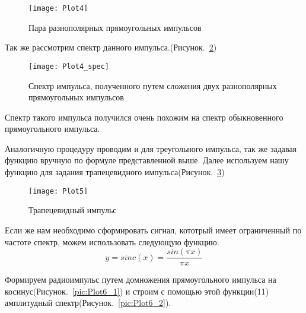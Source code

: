 \begin{figure}[H]
	\begin{center}
		\texttt{[image: Plot4]}
		\caption{Пара разнополярных прямоугольных импульсов} 
		\label{pic:Plot4} %
	\end{center}
\end{figure}

Так же рассмотрим спектр данного импульса.(Рисунок.~\ref{pic:Plot4_spec})
\begin{figure}[H]
	\begin{center}
		\texttt{[image: Plot4\_spec]}
		\caption{Спектр импульса, полученного путем сложения двух разнополярных прямоугольных импульсов} 
		\label{pic:Plot4_spec} %
	\end{center}
\end{figure}
Спектр такого импульса получился очень похожим на спектр обыкновенного прямоугольного импульса.

Аналогичную процедуру проводим и для треугольного импульса, так же задавая функцию вручную по формуле представленной выше. Далее  используем нашу функцию для задания трапецевидного импульса(Рисунок.~\ref{pic:Plot5})


\parindent=1cm %

\begin{figure}[H]
	\begin{center}
		\texttt{[image: Plot5]}
		\caption{Трапецевидный импульс} 
		\label{pic:Plot5} %
	\end{center}
\end{figure}



Если же нам необходимо  сформировать сигнал, кототрый имеет ограниченный по частоте спектр, можем использовать следующую функцию: \begin{equation} y = sinc(x) = \frac{sin(\pi  x)}{\pi x} \end{equation}

Формируем радиоимпульс путем домножения прямоугольного импульса на косинус(Рисунок.~\ref{pic:Plot6_1}) и строим с помощью этой функции(11) амплитудный спектр(Рисунок.~\ref{pic:Plot6_2}).


\parindent=1cm %

